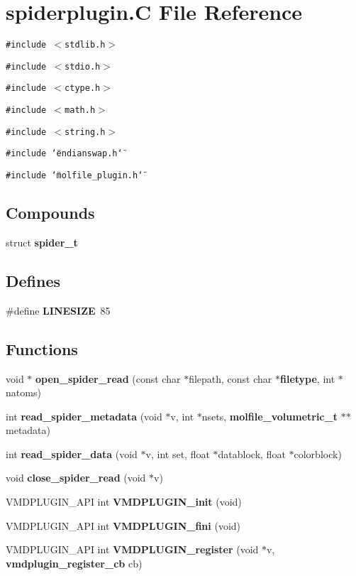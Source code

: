 \section{spiderplugin.C File Reference}
\label{spiderplugin_8C}
{\tt \#include $<$stdlib.h$>$}\par
{\tt \#include $<$stdio.h$>$}\par
{\tt \#include $<$ctype.h$>$}\par
{\tt \#include $<$math.h$>$}\par
{\tt \#include $<$string.h$>$}\par
{\tt \#include \char`\"{}endianswap.h\char`\"{}}\par
{\tt \#include \char`\"{}molfile\_\-plugin.h\char`\"{}}\par
\subsection*{Compounds}
\begin{CompactItemize}
\item 
struct {\bf spider\_\-t}
\end{CompactItemize}
\subsection*{Defines}
\begin{CompactItemize}
\item 
\#define {\bf LINESIZE}\ 85
\end{CompactItemize}
\subsection*{Functions}
\begin{CompactItemize}
\item 
void $\ast$ {\bf open\_\-spider\_\-read} (const char $\ast$filepath, const char $\ast${\bf filetype}, int $\ast$natoms)
\item 
int {\bf read\_\-spider\_\-metadata} (void $\ast$v, int $\ast$nsets, {\bf molfile\_\-volumetric\_\-t} $\ast$$\ast$metadata)
\item 
int {\bf read\_\-spider\_\-data} (void $\ast$v, int set, float $\ast$datablock, float $\ast$colorblock)
\item 
void {\bf close\_\-spider\_\-read} (void $\ast$v)
\item 
VMDPLUGIN\_\-API int {\bf VMDPLUGIN\_\-init} (void)
\item 
VMDPLUGIN\_\-API int {\bf VMDPLUGIN\_\-fini} (void)
\item 
VMDPLUGIN\_\-API int {\bf VMDPLUGIN\_\-register} (void $\ast$v, {\bf vmdplugin\_\-register\_\-cb} cb)
\end{CompactItemize}
